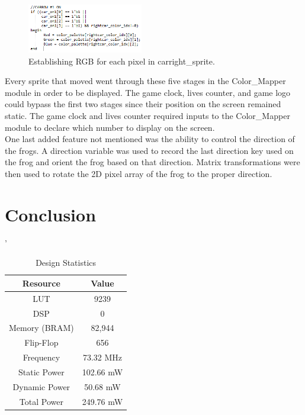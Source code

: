 \documentclass[journal, twocolumn, final,11pt,letterpaper]{IEEEtran}
\begin{document}
	\begin{figure}[H]
		\centering
		\includegraphics[width=0.45\textwidth]{sprite_description5.png}
		\caption{Establishing RGB for each pixel in carright\_sprite.}
		\label{fig:sprite_description5}
	\end{figure}	
	
Every sprite that moved went through these five stages in the  Color\_Mapper module in order to be displayed.  The game clock, lives counter, and game logo could bypass the first two stages since their position on the screen remained static.  The game clock and lives counter required inputs to the Color\_Mapper module to declare which number to display on the screen. \\

One last added feature not mentioned was the ability to control the direction of the frogs.  A direction variable was used to record the last direction key used on the frog and orient the frog based on that direction.  Matrix transformations were then used to rotate the 2D pixel array of the frog to the proper direction.  \\  	
	

\section{Conclusion} '
\begin{table}[htbp]
	\centering
	\begin{tabular}{c|c}	%
		\toprule	%
		Resource & Value \\
		\midrule
		LUT & 9239\\
		DSP & 0\\
		Memory (BRAM) & 82,944\\
		Flip-Flop & 656\\
		Frequency &  73.32 MHz\\
		Static Power & 102.66 mW\\
		Dynamic Power & 50.68 mW\\
		Total Power & 249.76 mW\\
		\bottomrule	%
	\end{tabular}%
	\caption{Design Statistics}
	\label{tab:design}
\end{table}
\end{document}
